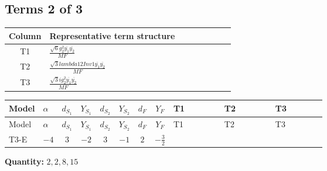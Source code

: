 \documentclass[8pt]{article}
\begin{document}
\begin{landscape}
\subsection*{Terms 2 of 3}
\begin{center}
\begin{tabular}{@{}c >{\raggedright\arraybackslash}p{0.82\linewidth}@{}}
\toprule
Column & Representative term structure \\
\midrule
T1 & \(\displaystyle \frac{\sqrt{6} g_{2}^{2} \overline{y_{1}} \overline{y_{2}}}{MF}\) \\
\midrule
T2 & \(\displaystyle \frac{\sqrt{3} lambda12Inv1 \overline{y_{1}} \overline{y_{2}}}{MF}\) \\
\midrule
T3 & \(\displaystyle \frac{\sqrt{3} i g_{2}^{2} \overline{y_{1}} \overline{y_{2}}}{MF}\) \\
\midrule
\bottomrule
\end{tabular}
\end{center}
\smallskip
\tiny
\begin{longtable}{@{}llcccccc >{\raggedright\arraybackslash}p{0.21\linewidth} >{\raggedright\arraybackslash}p{0.21\linewidth} >{\raggedright\arraybackslash}p{0.21\linewidth}@{}}
\toprule
Model & $\alpha$ & $d_{S_1}$ & $Y_{S_1}$ & $d_{S_2}$ & $Y_{S_2}$ & $d_F$ & $Y_F$ & T1 & T2 & T3 \\
\midrule
\endfirsthead
\toprule
Model & $\alpha$ & $d_{S_1}$ & $Y_{S_1}$ & $d_{S_2}$ & $Y_{S_2}$ & $d_F$ & $Y_F$ & T1 & T2 & T3 \\
\midrule
\endhead
T3-E & $-4$ & $3$ & $-2$ & $3$ & $-1$ & $2$ & $-\frac{3}{2}$ & \scriptsize\adjustbox{max width=\linewidth}{$\begin{gathered} - \frac{\sqrt{6} g_{2}^{2} \overline{y_{1}} \overline{y_{2}}}{3 MF}\end{gathered}$} & \scriptsize\adjustbox{max width=\linewidth}{$\begin{gathered} \frac{\sqrt{3} lambda12Inv1 \overline{y_{1}} \overline{y_{2}}}{6 MF}\end{gathered}$} & \scriptsize\adjustbox{max width=\linewidth}{$\begin{gathered} - \frac{\sqrt{3} i g_{2}^{2} \overline{y_{1}} \overline{y_{2}}}{6 MF}\end{gathered}$} \\
\midrule
\bottomrule
\end{longtable}
\clearpage
\noindent\textbf{Quantity: }$\mathrm{2,2,8,15}$\par\smallskip

\end{landscape}
\end{document}
